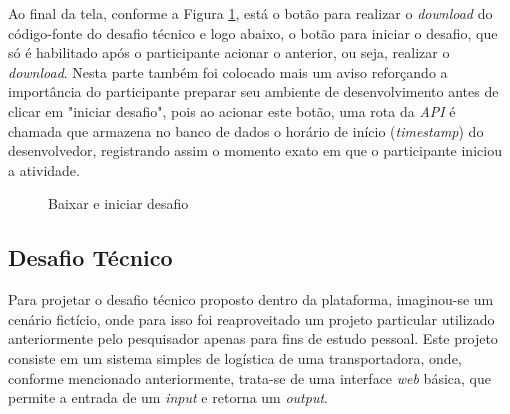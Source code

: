 \documentclass[english,brazilian]{UNISINOSartigo} %
\begin{document}
Ao final da tela, conforme a Figura \ref{fig:baixar_iniciar_desafio}, está o botão para realizar o \textit{download} do código-fonte do desafio técnico e logo abaixo, o botão para iniciar o desafio, que só é habilitado após o participante acionar o anterior, ou seja, realizar o \textit{download}. Nesta parte também foi colocado mais um aviso reforçando a importância do participante preparar seu ambiente de desenvolvimento antes de clicar em "iniciar desafio", pois ao acionar este botão, uma rota da \textit{API} é chamada que armazena no banco de dados o horário de início (\textit{timestamp}) do desenvolvedor, registrando assim o momento exato em que o participante iniciou a atividade.

\begin{figure}[ht]
    \caption{Baixar e iniciar desafio}
    \label{fig:baixar_iniciar_desafio}
    \centering
    \footnotesize
    \begin{minipage}{.9\textwidth}
        \centering
    \end{minipage}
\end{figure}
\FloatBarrier

\subsection{Desafio Técnico}

Para projetar o desafio técnico proposto dentro da plataforma, imaginou-se um cenário fictício, onde para isso foi reaproveitado um projeto particular utilizado anteriormente pelo pesquisador apenas para fins de estudo pessoal. Este projeto consiste em um sistema simples de logística de uma transportadora, onde, conforme mencionado anteriormente, trata-se de uma interface \textit{web} básica, que permite a entrada de um \textit{input} e retorna um \textit{output}.
\end{document}
